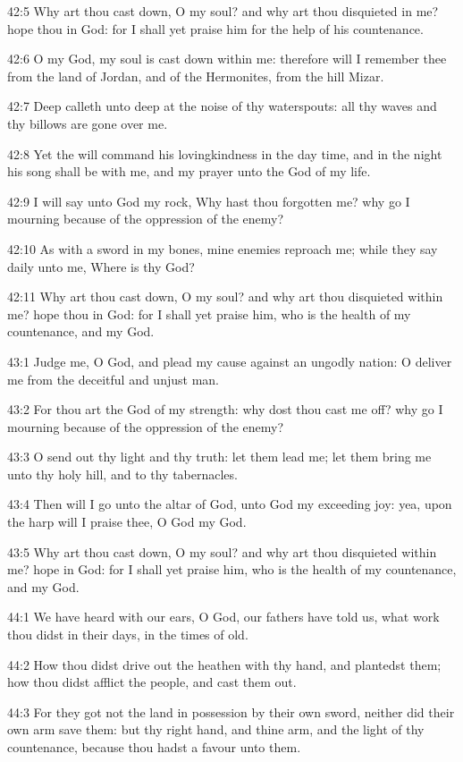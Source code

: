 42:5 Why art thou cast down, O my soul? and why art thou disquieted in me?  hope thou in God: for I shall yet praise him for the help of his countenance.

42:6 O my God, my soul is cast down within me: therefore will I remember thee from the land of Jordan, and of the Hermonites, from the hill Mizar.

42:7 Deep calleth unto deep at the noise of thy waterspouts: all thy waves and thy billows are gone over me.

42:8 Yet the \LORD will command his lovingkindness in the day time, and in the night his song shall be with me, and my prayer unto the God of my life.

42:9 I will say unto God my rock, Why hast thou forgotten me? why go I mourning because of the oppression of the enemy?

42:10 As with a sword in my bones, mine enemies reproach me; while they say daily unto me, Where is thy God?

42:11 Why art thou cast down, O my soul? and why art thou disquieted within me? hope thou in God: for I shall yet praise him, who is the health of my countenance, and my God.



43:1 Judge me, O God, and plead my cause against an ungodly nation: O deliver me from the deceitful and unjust man.

43:2 For thou art the God of my strength: why dost thou cast me off?  why go I mourning because of the oppression of the enemy?

43:3 O send out thy light and thy truth: let them lead me; let them bring me unto thy holy hill, and to thy tabernacles.

43:4 Then will I go unto the altar of God, unto God my exceeding joy: yea, upon the harp will I praise thee, O God my God.

43:5 Why art thou cast down, O my soul? and why art thou disquieted within me? hope in God: for I shall yet praise him, who is the health of my countenance, and my God.



44:1 We have heard with our ears, O God, our fathers have told us, what work thou didst in their days, in the times of old.

44:2 How thou didst drive out the heathen with thy hand, and plantedst them; how thou didst afflict the people, and cast them out.

44:3 For they got not the land in possession by their own sword, neither did their own arm save them: but thy right hand, and thine arm, and the light of thy countenance, because thou hadst a favour unto them.


